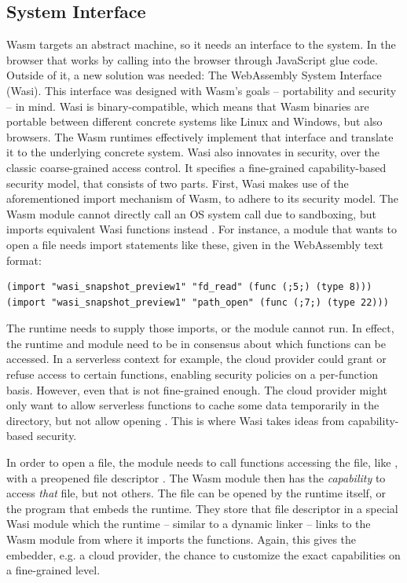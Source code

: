 \subsection{System Interface}

Wasm targets an abstract machine, so it needs an interface to the system. In the browser that works by calling into the browser through JavaScript glue code. Outside of it, a new solution was needed: The WebAssembly System Interface (Wasi). This interface was designed with Wasm's goals -- portability and security -- in mind.
Wasi is binary-compatible, which means that Wasm binaries are portable between different concrete systems like Linux and Windows, but also browsers. The Wasm runtimes effectively implement that interface and translate it to the underlying concrete system.
Wasi also innovates in security, over the classic coarse-grained access control. It specifies a fine-grained capability-based security model, that consists of two parts. First, Wasi makes use of the aforementioned import mechanism of Wasm, to adhere to its security model. The Wasm module cannot directly call an OS system call due to sandboxing, but imports equivalent Wasi functions instead \cite{Clark2019}. For instance, a module that wants to open a file needs import statements like these, given in the WebAssembly text format:

\begin{verbatim}
(import "wasi_snapshot_preview1" "fd_read" (func (;5;) (type 8)))
(import "wasi_snapshot_preview1" "path_open" (func (;7;) (type 22)))
\end{verbatim}

The runtime needs to supply those imports, or the module cannot run. In effect, the runtime and module need to be in consensus about which functions can be accessed. In a serverless context for example, the cloud provider could grant or refuse access to certain functions, enabling security policies on a per-function basis. However, even that is not fine-grained enough. The cloud provider might only want to allow serverless functions to cache some data temporarily in the  directory, but not allow opening . This is where Wasi takes ideas from capability-based security.

In order to open a file, the module needs to call functions accessing the file, like , with a preopened file descriptor \cite{Clark2019}. The Wasm module then has the \emph{capability} to access \emph{that} file, but not others. The file can be opened by the runtime itself, or the program that embeds the runtime. They store that file descriptor in a special Wasi module which the runtime -- similar to a dynamic linker -- links to the Wasm module from where it imports the functions. Again, this gives the embedder, e.g. a cloud provider, the chance to customize the exact capabilities on a fine-grained level.

